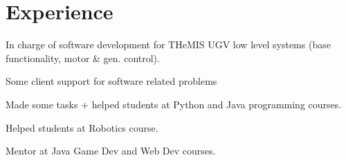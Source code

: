 \documentclass[letterpaper]{deedy-resume} %
\begin{document}
\begin{minipage}[t]{0.66\textwidth} %


\section{Experience}


\vspace{\topsep} %
\begin{tightitemize}
  \item In charge of software development for THeMIS UGV low level systems (base functionality, motor \& gen. control).
  \item Some client support for software related problems
\end{tightitemize}

\sectionspace %



\begin{tightitemize}
\item Made some tasks + helped students at Python and Java programming courses.
\item Helped students at Robotics course.
\item Mentor at Java Game Dev and Web Dev courses.
\end{tightitemize}

\sectionspace %




\end{minipage}
\end{document}
